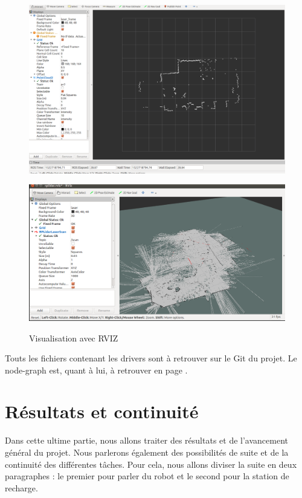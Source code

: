 \documentclass[french]{rapportENSTAB}
\begin{document}
\begin{figure}[h]
\centering
\begin{minipage}[b]{.5\textwidth}
  \centering
  \includegraphics[width=.95\linewidth]{images/robot/lidar.png}
  \label{fig:archi elec}
\end{minipage}%
%
\begin{minipage}[b]{.61\textwidth}
  \centering
  \includegraphics[width=.95\linewidth]{images/robot/lidarslam.png}
  \label{fig:archi elec}
\end{minipage}
%


\vspace{3mm}
\caption{Visualisation avec RVIZ}
\label{fig:archi elec}
\end{figure}


Touts les fichiers contenant les drivers sont à retrouver sur le Git du projet. Le node-graph est, quant à lui, à retrouver en page \pageref{annexe5}.

\section{Résultats et continuité}
Dans cette ultime partie, nous allons traiter des résultats et de l'avancement général du projet. Nous parlerons également des possibilités de suite et de la continuité des différentes tâches. Pour cela, nous allons diviser la suite en deux paragraphes : le premier pour parler du robot et le second pour la station de recharge.\\
\end{document}
